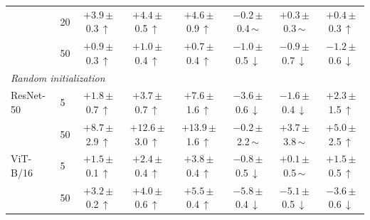 \begin{table}[htbp]
\begin{tabular}{llcccccc}
 & 20 & $+3.9$\,{\scriptsize$\pm$0.3}\,$\uparrow$ & $+4.4$\,{\scriptsize$\pm$0.5}\,$\uparrow$ & $+4.6$\,{\scriptsize$\pm$0.9}\,$\uparrow$ & $-0.2$\,{\scriptsize$\pm$0.4}\,$\sim$ & $+0.3$\,{\scriptsize$\pm$0.3}\,$\sim$ & $+0.4$\,{\scriptsize$\pm$0.3}\,$\uparrow$ \\
 & 50 & $+0.9$\,{\scriptsize$\pm$0.3}\,$\uparrow$ & $+1.0$\,{\scriptsize$\pm$0.4}\,$\uparrow$ & $+0.7$\,{\scriptsize$\pm$0.4}\,$\uparrow$ & $-1.0$\,{\scriptsize$\pm$0.5}\,$\downarrow$ & $-0.9$\,{\scriptsize$\pm$0.7}\,$\downarrow$ & $-1.2$\,{\scriptsize$\pm$0.6}\,$\downarrow$ \\
\midrule
\multicolumn{8}{l}{\textit{Random initialization}} \\
ResNet-50 & 5 & $+1.8$\,{\scriptsize$\pm$0.7}\,$\uparrow$ & $+3.7$\,{\scriptsize$\pm$0.7}\,$\uparrow$ & $+7.6$\,{\scriptsize$\pm$1.6}\,$\uparrow$ & $-3.6$\,{\scriptsize$\pm$0.6}\,$\downarrow$ & $-1.6$\,{\scriptsize$\pm$0.4}\,$\downarrow$ & $+2.3$\,{\scriptsize$\pm$1.5}\,$\uparrow$ \\
 & 50 & $+8.7$\,{\scriptsize$\pm$2.9}\,$\uparrow$ & $+12.6$\,{\scriptsize$\pm$3.0}\,$\uparrow$ & $+13.9$\,{\scriptsize$\pm$1.6}\,$\uparrow$ & $-0.2$\,{\scriptsize$\pm$2.2}\,$\sim$ & $+3.7$\,{\scriptsize$\pm$3.8}\,$\sim$ & $+5.0$\,{\scriptsize$\pm$2.5}\,$\uparrow$ \\
\addlinespace[2pt]
ViT-B/16 & 5 & $+1.5$\,{\scriptsize$\pm$0.1}\,$\uparrow$ & $+2.4$\,{\scriptsize$\pm$0.4}\,$\uparrow$ & $+3.8$\,{\scriptsize$\pm$0.4}\,$\uparrow$ & $-0.8$\,{\scriptsize$\pm$0.5}\,$\downarrow$ & $+0.1$\,{\scriptsize$\pm$0.5}\,$\sim$ & $+1.5$\,{\scriptsize$\pm$0.5}\,$\uparrow$ \\
 & 50 & $+3.2$\,{\scriptsize$\pm$0.2}\,$\uparrow$ & $+4.0$\,{\scriptsize$\pm$0.6}\,$\uparrow$ & $+5.5$\,{\scriptsize$\pm$0.4}\,$\uparrow$ & $-5.8$\,{\scriptsize$\pm$0.4}\,$\downarrow$ & $-5.1$\,{\scriptsize$\pm$0.5}\,$\downarrow$ & $-3.6$\,{\scriptsize$\pm$0.6}\,$\downarrow$ \\
\bottomrule
\end{tabular}
\end{table}
